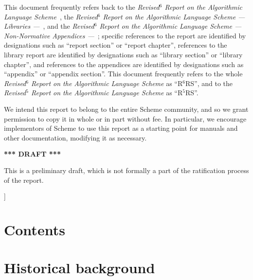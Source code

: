 \documentclass[twoside,twocolumn]{algol60}
\newcommand{\rn}[1]{R$^{#1}$RS}
\begin{document}
{{This document frequently refers back to the \textit{Revised$^6$ Report
  on the Algorithmic Language Scheme}~\cite{R6RS}, the
\textit{Revised$^6$ Report on the Algorithmic Language Scheme ---
  Libraries ---}~\cite{R6RS-libraries}, and the \textit{Revised$^6$
  Report on the Algorithmic Language Scheme --- Non-Normative
  Appendices ---}~\cite{R6RS-appendices}; specific references to the
report are identified by designations such as ``report section'' or
``report chapter'', references to the library report are identified by
designations such as ``library section'' or ``library chapter'', and
references to the appendices are identified by designations such as
``appendix'' or ``appendix section''.  This document frequently refers
to the whole \textit{Revised$^6$ Report on the Algorithmic Language
  Scheme} as ``\rn{6}'', and to the \textit{Revised$^5$ Report
  on the Algorithmic Language Scheme} as ``\rn{5}''.
}

\medskip

We intend this report to belong to the entire Scheme community, and so
we grant permission to copy it in whole or in part without fee.  In
particular, we encourage implementors of Scheme to use this report as
a starting point for manuals and other documentation, modifying it as
necessary.

\begin{center}
{\large \bf
*** DRAFT *** \\
}\end{center}

This is a preliminary draft, which is not formally a part of the
ratification process of the report.

}]

\texonly\clearpage\endtexonly

\chapter*{Contents}
\addvspace{3.5pt}                  %
\renewcommand{\tocshrink}{-4.0pt}  %
{%
\tableofcontents
}

\vfill

\texonly\clearpage\endtexonly


\chapter{Historical background}
\end{document}
